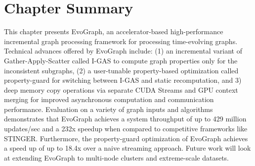 \section{Chapter Summary}
This chapter presents EvoGraph, an accelerator-based high-performance incremental graph processing framework for processing time-evolving graphs. Technical advances offered by EvoGraph include: (1) an incremental variant of Gather-Apply-Scatter called I-GAS to compute graph properties only for the inconsistent subgraphs, (2) a user-tunable property-based optimization called property-guard for switching between I-GAS and static recomputation, and 3) deep memory copy operations via separate CUDA Streams and GPU context merging for improved asynchronous computation and communication performance. Evaluation on a variety of graph inputs and algorithms demonstrates that EvoGraph achieves a system throughput of up to 429 million updates/sec and a 232x speedup when compared to competitive frameworks like STINGER. Furthermore, the property-guard optimization of EvoGraph achieves a speed up of up to 18.4x over a naive streaming approach. Future work will look at extending EvoGraph to multi-node clusters and extreme-scale datasets.


